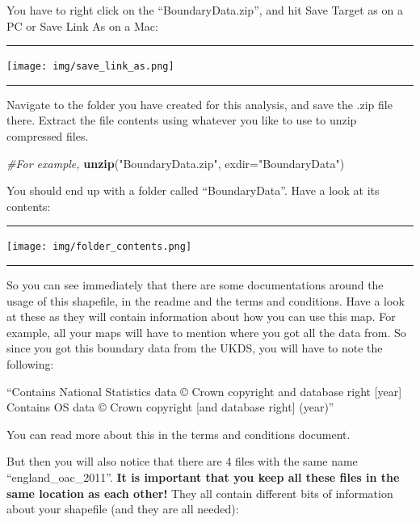 \documentclass[]{book}
\newenvironment{Shaded}{\begin{snugshade}}{\end{snugshade}}
\newcommand{\CommentTok}[1]{\textcolor[rgb]{0.56,0.35,0.01}{\textit{#1}}}
\newcommand{\DataTypeTok}[1]{\textcolor[rgb]{0.13,0.29,0.53}{#1}}
\newcommand{\KeywordTok}[1]{\textcolor[rgb]{0.13,0.29,0.53}{\textbf{#1}}}
\newcommand{\NormalTok}[1]{#1}
\newcommand{\StringTok}[1]{\textcolor[rgb]{0.31,0.60,0.02}{#1}}
\begin{document}
You have to right click on the ``BoundaryData.zip'', and hit Save Target as on a PC or Save Link As on a Mac:

\begin{center}\rule{0.5\linewidth}{0.5pt}\end{center}

\texttt{[image: img/save\_link\_as.png]}

\begin{center}\rule{0.5\linewidth}{0.5pt}\end{center}

Navigate to the folder you have created for this analysis, and save the .zip file there. Extract the file contents using whatever you like to use to unzip compressed files.

\begin{Shaded}
\begin{Highlighting}[]
\CommentTok{#For example,}
\KeywordTok{unzip}\NormalTok{(}\StringTok{"BoundaryData.zip"}\NormalTok{, }\DataTypeTok{exdir=}\StringTok{"BoundaryData"}\NormalTok{)}
\end{Highlighting}
\end{Shaded}

You should end up with a folder called ``BoundaryData''. Have a look at its contents:

\begin{center}\rule{0.5\linewidth}{0.5pt}\end{center}

\texttt{[image: img/folder\_contents.png]}

\begin{center}\rule{0.5\linewidth}{0.5pt}\end{center}

So you can see immediately that there are some documentations around the usage of this shapefile, in the readme and the terms and conditions. Have a look at these as they will contain information about how you can use this map. For example, all your maps will have to mention where you got all the data from. So since you got this boundary data from the UKDS, you will have to note the following:

``Contains National Statistics data © Crown copyright and database right {[}year{]}
Contains OS data © Crown copyright {[}and database right{]} (year)''

You can read more about this in the terms and conditions document.

But then you will also notice that there are 4 files with the same name ``england\_oac\_2011''. \textbf{It is important that you keep all these files in the same location as each other!} They all contain different bits of information about your shapefile (and they are all needed):
\end{document}
